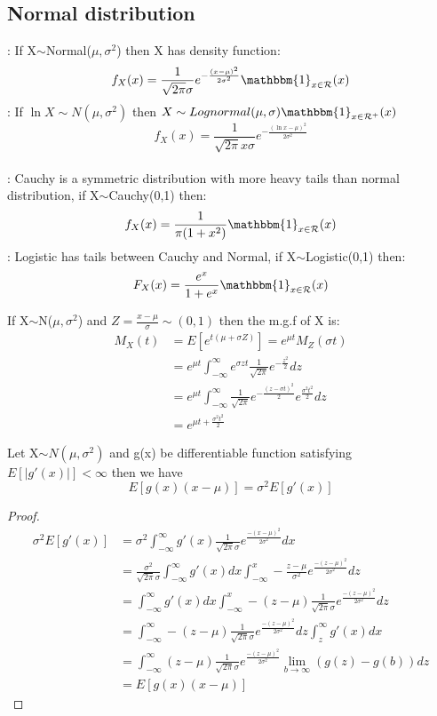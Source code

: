 \documentclass[../Distributions.tex]{subfiles}
\begin{document}
\subsection{Normal distribution}
: If X$\sim$Normal($\mu,\sigma^2$) then X has density function: $$f_X(x)=\frac{1}{\sqrt{2\pi}\sigma}e^{-\frac{(x-\mu)^2}{2\sigma^2}}\mathbbm{1}_{x\in\mathcal{R}}(x)$$
: If $\ln X\sim N(\mu,\sigma^2)$ then $X\sim Lognormal(\mu,\sigma)\mathbbm{1}_{x\in\mathcal{R}^+}(x)$
$$f_X(x)=\frac{1}{\sqrt{2\pi}x\sigma}e^{-\frac{(\ln x-\mu)^2}{2\sigma^2}}$$\\
: Cauchy is a symmetric distribution with more heavy tails than normal distribution, if X$\sim$Cauchy(0,1) then:
$$f_X(x)=\frac{1}{\pi(1+x^2)}\mathbbm{1}_{x\in\mathcal{R}}(x)$$
: Logistic has tails between Cauchy and Normal, if X$\sim$Logistic(0,1) then:
$$F_X(x)=\frac{e^x}{1+e^x}\mathbbm{1}_{x\in\mathcal{R}}(x)$$
\begin{property} If X$\sim$N($\mu,\sigma^2$) and $Z=\frac{x-\mu}{\sigma}\sim(0,1)$ then the m.g.f of X is:
\begin{align*}
M_X(t)&=E[e^{t(\mu+\sigma Z)}]=e^{\mu t}M_Z(\sigma t)\\
&=e^{\mu t}\int_{-\infty}^{\infty}e^{\sigma zt}\frac{1}{\sqrt{2\pi}}e^{-\frac{z^2}{2}}dz\\
&=e^{\mu t}\int_{-\infty}^{\infty}\frac{1}{\sqrt{2\pi}}e^{-\frac{(z-\sigma t)^2}{2}}e^{\frac{\sigma^2t^2}{2}}dz\\
&=e^{\mu t+\frac{\sigma^2t^2}{2}}
\end{align*}
\begin{theorem}Let X$\sim N(\mu,\sigma^2)$ and g(x) be differentiable function satisfying $E[|g'(x)|]<\infty$ then we have  $$E[g(x)(x-\mu)]=\sigma^2E[g'(x)]$$
\begin{proof}
\begin{align*}
\sigma^2E[g'(x)]&=\sigma^2\int_{-\infty}^{\infty}g'(x)\frac{1}{\sqrt{2\pi}\sigma}e^{\frac{-(x-\mu)^2}{2\sigma^2}}dx\\
&=\frac{\sigma^2}{\sqrt{2\pi}\sigma}\int_{-\infty}^{\infty}g'(x)dx\int_{-\infty}^{x}-\frac{z-\mu}{\sigma^2}e^{\frac{-(z-\mu)^2}{2\sigma^2}}dz\\
&=\int_{-\infty}^{\infty}g'(x)dx\int_{-\infty}^{x}-(z-\mu)\frac{1}{\sqrt{2\pi}\sigma}e^{\frac{-(z-\mu)^2}{2\sigma^2}}dz\\
&=\int_{-\infty}^{\infty}-(z-\mu)\frac{1}{\sqrt{2\pi}\sigma}e^{\frac{-(z-\mu)^2}{2\sigma^2}}dz\int_{z}^{\infty}g'(x)dx\\
&=\int_{-\infty}^{\infty}(z-\mu)\frac{1}{\sqrt{2\pi}\sigma}e^{\frac{-(z-\mu)^2}{2\sigma^2}}\lim_{b\rightarrow\infty}(g(z)-g(b))dz\\
&=E[g(x)(x-\mu)]
\end{align*}
\end{proof}
\end{theorem}
\end{property}
\end{document}
